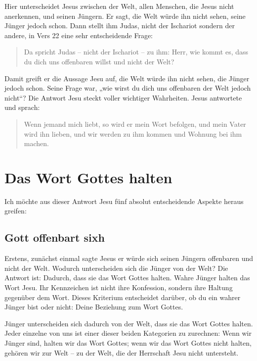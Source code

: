 Hier unterscheidet Jesus zwischen der Welt, allen Menschen, die Jesus nicht anerkennen, und seinen Jüngern. 
Er sagt, die Welt würde ihn nicht sehen, seine Jünger jedoch schon. 
Dann stellt ihm Judas, nicht der Ischariot sondern der andere, in Vers 22 eine sehr entscheidende Frage:

\begin{quotation}
  Da spricht Judas – nicht der Ischariot – zu ihm: Herr, wie kommt es, dass du dich uns offenbaren willst und nicht der Welt?
\end{quotation}

Damit greift er die Aussage Jesu auf, die Welt würde ihn nicht sehen, die Jünger jedoch schon. Seine Frage war, „wie wirst du dich uns offenbaren der Welt jedoch nicht“? 
Die Antwort Jesu steckt voller wichtiger Wahrheiten. Jesus antwortete und sprach:

\begin{quotation}
  Wenn jemand mich liebt, so wird er mein Wort befolgen, und mein Vater wird ihn lieben, und wir werden zu ihm kommen und Wohnung bei ihm machen.
\end{quotation}

\section{Das Wort Gottes halten}

Ich möchte aus dieser Antwort Jesu fünf absolut entscheidende Aspekte heraus greifen:

\subsection{Gott offenbart sixh}

Erstens, zunächst einmal sagte Jesus er würde sich seinen Jüngern offenbaren und nicht der Welt. 
Wodurch unterscheiden sich die Jünger von der Welt? 
Die Antwort ist: Dadurch, dass sie das Wort Gottes halten. 
Wahre Jünger halten das Wort Jesu. 
Ihr Kennzeichen ist nicht ihre Konfession, sondern ihre Haltung gegenüber dem Wort. 
Dieses Kriterium entscheidet darüber, ob du ein wahrer Jünger bist oder nicht: Deine Beziehung zum Wort Gottes.

Jünger unterscheiden sich dadurch von der Welt, dass sie das Wort Gottes halten. 
Jeder einzelne von uns ist einer dieser beiden Kategorien zu zurechnen: Wenn wir Jünger sind, halten wir das Wort Gottes; wenn wir das Wort Gottes nicht halten, gehören wir zur Welt – zu der Welt, die der Herrschaft Jesu nicht untersteht.

